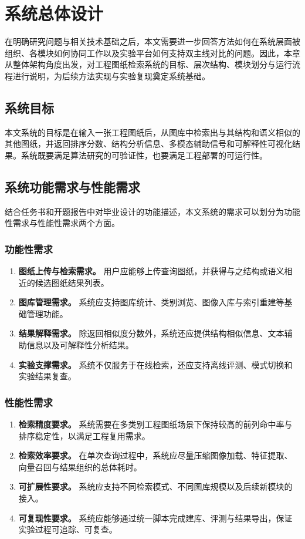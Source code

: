 \chapter{系统总体设计}

在明确研究问题与相关技术基础之后，本文需要进一步回答方法如何在系统层面被组织、各模块如何协同工作以及实验平台如何支持双主线对比的问题。因此，本章从整体架构角度出发，对工程图纸检索系统的目标、层次结构、模块划分与运行流程进行说明，为后续方法实现与实验复现奠定系统基础。

\section{系统目标}

本文系统的目标是在输入一张工程图纸后，从图库中检索出与其结构和语义相似的其他图纸，并返回排序分数、结构分析信息、多模态辅助信号和可解释性可视化结果。系统既要满足算法研究的可验证性，也要满足工程部署的可运行性。

\section{系统功能需求与性能需求}

结合任务书和开题报告中对毕业设计的功能描述，本文系统的需求可以划分为功能性需求与性能性需求两个方面。

\subsection{功能性需求}

\begin{enumerate}
  \item \textbf{图纸上传与检索需求。} 用户应能够上传查询图纸，并获得与之结构或语义相近的候选图纸结果列表。
  \item \textbf{图库管理需求。} 系统应支持图库统计、类别浏览、图像入库与索引重建等基础管理功能。
  \item \textbf{结果解释需求。} 除返回相似度分数外，系统还应提供结构相似信息、文本辅助信息以及可解释性分析结果。
  \item \textbf{实验支撑需求。} 系统不仅服务于在线检索，还应支持离线评测、模式切换和实验结果复查。
\end{enumerate}

\subsection{性能性需求}

\begin{enumerate}
  \item \textbf{检索精度要求。} 系统需要在多类别工程图纸场景下保持较高的前列命中率与排序稳定性，以满足工程复用需求。
  \item \textbf{检索效率要求。} 在单次查询过程中，系统应尽量压缩图像加载、特征提取、向量召回与结果组织的总体耗时。
  \item \textbf{可扩展性要求。} 系统应支持不同检索模式、不同图库规模以及后续新模块的接入。
  \item \textbf{可复现性要求。} 系统应能够通过统一脚本完成建库、评测与结果导出，保证实验过程可追踪、可复查。
\end{enumerate}

